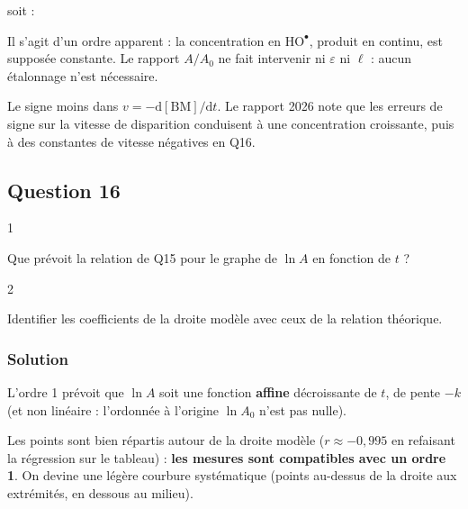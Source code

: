 \documentclass[11pt,a4paper]{article}
\newcommand{\equationajustee}[1]{%
  \sbox{\boiteequation}{$\displaystyle #1$}%
  \ifdim\wd\boiteequation>\linewidth
    \[\resizebox{\linewidth}{!}{\usebox{\boiteequation}}\]%
  \else
    \[#1\]%
  \fi}
\begin{document}
\equationajustee{\boxed{A(t)=A_0\,e^{-kt}}}

soit :

\equationajustee{\boxed{\ln A=\ln A_0-k\,t}}

Il s'agit d'un ordre apparent : la concentration en \(\mathrm{HO^\bullet}\), produit en continu, est supposée constante. Le rapport \(A/A_0\) ne fait intervenir ni \(\varepsilon\) ni \(\ell\) : aucun étalonnage n'est nécessaire.

\begin{piege}

Le signe moins dans \(v=-\mathrm d[\mathrm{BM}]/\mathrm dt\). Le rapport 2026 note que les erreurs de signe sur la vitesse de disparition conduisent à une concentration croissante, puis à des constantes de vitesse négatives en Q16.

\end{piege}

\hypertarget{question-16}{%
\subsection{Question 16}\label{question-16}}

\begin{indication}{1}

Que prévoit la relation de Q15 pour le graphe de \(\ln A\) en fonction de \(t\) ?

\end{indication}

\begin{indication}{2}

Identifier les coefficients de la droite modèle avec ceux de la relation théorique.

\end{indication}

\hypertarget{solution-15}{%
\subsubsection{Solution}\label{solution-15}}

L'ordre 1 prévoit que \(\ln A\) soit une fonction \textbf{affine} décroissante de \(t\), de pente \(-k\) (et non linéaire : l'ordonnée à l'origine \(\ln A_0\) n'est pas nulle).

Les points sont bien répartis autour de la droite modèle (\(r\approx-0{,}995\) en refaisant la régression sur le tableau) : \textbf{les mesures sont compatibles avec un ordre 1}. On devine une légère courbure systématique (points au-dessus de la droite aux extrémités, en dessous au milieu).
\end{document}
